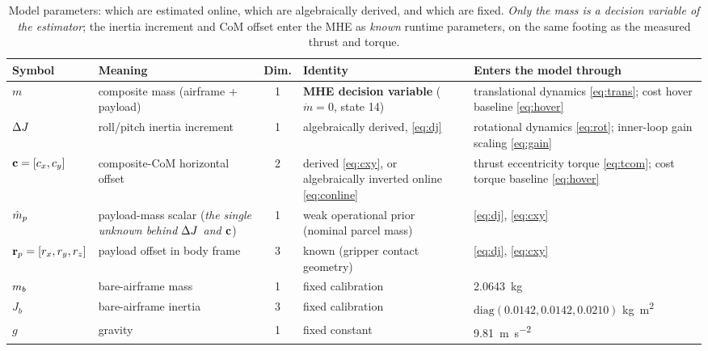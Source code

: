 \begin{table}[t]
\caption{Model parameters: which are estimated online, which are algebraically
derived, and which are fixed. \emph{Only the mass is a decision variable of the
estimator}; the inertia increment and CoM offset enter the MHE as \emph{known}
runtime parameters, on the same footing as the measured thrust and torque.}
\label{tab:params}
\centering
\footnotesize
\begin{tabular}{@{}l p{} c p{} p{}@{}}
\toprule
Symbol & Meaning & Dim. & Identity & Enters the model through \\
\midrule
$m$ & composite mass (airframe + payload) & 1 & \textbf{MHE decision variable} ($\dot m = 0$, state 14) & translational dynamics \eqref{eq:trans}; cost hover baseline \eqref{eq:hover} \\
$\Delta J$ & roll/pitch inertia increment & 1 & algebraically derived, \eqref{eq:dj} & rotational dynamics \eqref{eq:rot}; inner-loop gain scaling \eqref{eq:gain} \\
$\mathbf{c} = [c_x, c_y]$ & composite-CoM horizontal offset & 2 & derived \eqref{eq:cxy}, or algebraically inverted online \eqref{eq:conline} & thrust eccentricity torque \eqref{eq:tcom}; cost torque baseline \eqref{eq:hover} \\
\midrule
$\hat{m}_p$ & payload-mass scalar (\emph{the single unknown behind $\Delta J$ and $\mathbf{c}$}) & 1 & weak operational prior (nominal parcel mass) & \eqref{eq:dj}, \eqref{eq:cxy} \\
$\mathbf{r}_p = [r_x, r_y, r_z]$ & payload offset in body frame & 3 & known (gripper contact geometry) & \eqref{eq:dj}, \eqref{eq:cxy} \\
\midrule
$m_b$ & bare-airframe mass & 1 & fixed calibration & \SI{2.0643}{\kg} \\
$J_b$ & bare-airframe inertia & 3 & fixed calibration & $\mathrm{diag}(0.0142, 0.0142, 0.0210)$ \si{\kg\meter\squared} \\
$g$ & gravity & 1 & fixed constant & \SI{9.81}{\meter\per\second\squared} \\
\bottomrule
\end{tabular}
\end{table}

